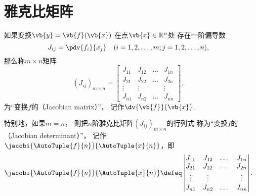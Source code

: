 \section{雅克比矩阵}
\begin{definition}
如果变换\(\vb{y} = \vb{f}(\vb{x})\)
在点\(\vb{x} \in \mathbb{R}^n\)处
存在一阶偏导数\begin{equation*}
	J_{ij} = \pdv{f_i}{x_j}
	\quad(i=1,2,\dotsc,m; j=1,2,\dotsc,n),
\end{equation*}
那么称\(m \times n\)矩阵\begin{equation*}
	(J_{ij})_{m \times n}
	= \begin{bmatrix}
		J_{11} & J_{12} & \dots & J_{1n} \\
		J_{21} & J_{22} & \dots & J_{2n} \\
		\vdots & \vdots & & \vdots \\
		J_{n1} & J_{n2} & \dots & J_{nn}
	\end{bmatrix},
\end{equation*}为“变换\(f\)的（Jacobian matrix）”，
记作\(\dv{\vb{f}}{\vb{x}}\).

特别地，如果\(m = n\)，
则把\(n\)阶雅克比矩阵\((J_{ij})_{m \times n}\)的行列式
称为“变换\(f\)的（Jacobian determinant）”，
记作\(\jacobi{\AutoTuple{f}{n}}{\AutoTuple{x}{n}}\)，即\begin{equation*}
	\jacobi{\AutoTuple{f}{n}}{\AutoTuple{x}{n}}
	\defeq \begin{vmatrix}
		J_{11} & J_{12} & \dots & J_{1n} \\
		J_{21} & J_{22} & \dots & J_{2n} \\
		\vdots & \vdots & & \vdots \\
		J_{n1} & J_{n2} & \dots & J_{nn}
	\end{vmatrix}.
\end{equation*}
\end{definition}

